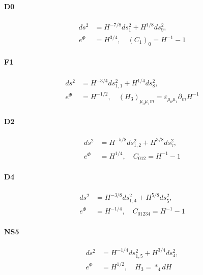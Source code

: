 \paragraph{D0}
\begin{equation}
\begin{aligned}
ds^2 &= H^{-7/8}ds_1^2 + H^{1/8}ds_9^2,\\
e^{\Phi} &= H^{3/4},\quad
(C_1)_0 = H^{-1}-1
\end{aligned}
\end{equation}

\paragraph{F1}
\begin{equation}
\begin{aligned}
ds^2 
&= H^{-3/4}ds_{1,1}^2 + H^{1/4}ds_8^2,\\
e^{\Phi}
&= H^{-1/2},\quad
(H_3)_{\mu_0\mu_1 m} = \varepsilon_{\mu_0 \mu_1} \partial_m H^{-1}
\end{aligned}
\end{equation}

\paragraph{D2}
\begin{equation}
\begin{aligned}
ds^2
&= H^{-5/8}ds_{1,2}^2 + H^{3/8}ds_7^2,\\
e^{\Phi}
&= H^{1/4},\quad
C_{012} = H^{-1}-1
\end{aligned}
\end{equation}

\paragraph{D4}
\begin{equation}
\begin{aligned}
ds^2
&= H^{-3/8}ds_{1,4}^2 + H^{5/8}ds_5^2,\\
e^{\Phi}
&= H^{-1/4},\quad
C_{01234} = H^{-1}-1
\end{aligned}
\end{equation}

\paragraph{NS5}
\begin{equation}
\begin{aligned}
ds^2 
&= H^{-1/4}ds_{1,5}^2 + H^{3/4}ds_4^2,\\
e^{\Phi}
&= H^{1/2},\quad H_3 = *_4 dH
\end{aligned}
\end{equation}

